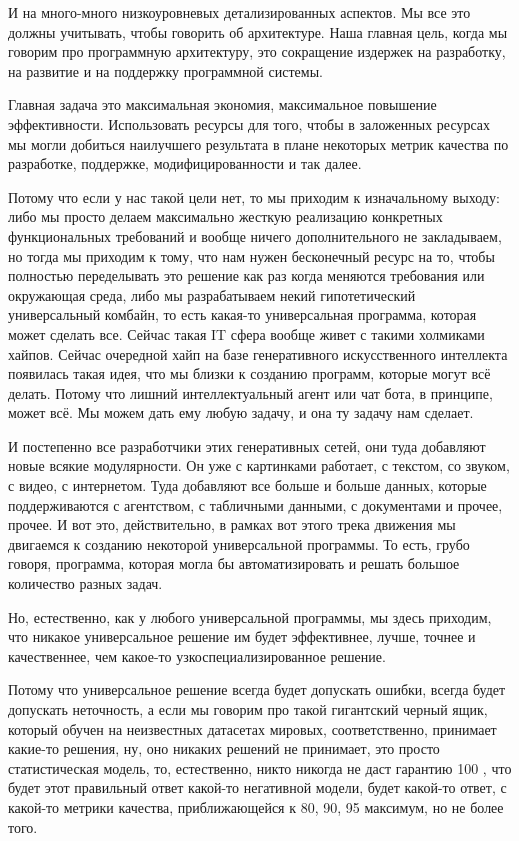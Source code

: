И на много-много низкоуровневых детализированных аспектов. Мы все это должны учитывать, чтобы говорить об архитектуре. Наша главная цель, когда мы говорим про программную архитектуру, это сокращение издержек на разработку, на развитие и на поддержку программной системы.

Главная задача это максимальная экономия, максимальное повышение эффективности. Использовать ресурсы для того, чтобы в заложенных ресурсах мы могли добиться наилучшего результата в плане некоторых метрик качества по разработке, поддержке, модифицированности и так далее.

Потому что если у нас такой цели нет, то мы приходим к изначальному выходу: либо мы просто делаем максимально жесткую реализацию конкретных функциональных требований и вообще ничего дополнительного не закладываем, но тогда мы приходим к тому, что нам нужен бесконечный ресурс на то, чтобы полностью переделывать это решение как раз когда меняются требования или окружающая среда, либо мы разрабатываем некий гипотетический универсальный комбайн, то есть какая-то универсальная программа, которая может сделать все. Сейчас такая IT сфера вообще живет с такими холмиками хайпов. Сейчас очередной хайп на базе генеративного искусственного интеллекта появилась такая идея, что мы близки к созданию программ, которые могут всё делать. Потому что лишний интеллектуальный агент или чат бота, в принципе, может всё. Мы можем дать ему любую задачу, и она ту задачу нам сделает.

И постепенно все разработчики этих генеративных сетей, они туда добавляют новые всякие модулярности. Он уже с картинками работает, с текстом, со звуком, с видео, с интернетом. Туда добавляют все больше и больше данных, которые поддерживаются с агентством, с табличными данными, с документами и прочее, прочее. И вот это, действительно, в рамках вот этого трека движения мы двигаемся к созданию некоторой универсальной программы. То есть, грубо говоря, программа, которая могла бы автоматизировать и решать большое количество разных задач. 

Но, естественно, как у любого универсальной программы, мы здесь приходим, что никакое универсальное решение им будет эффективнее, лучше, точнее и качественнее, чем какое-то узкоспециализированное решение. 

Потому что универсальное решение всегда будет допускать ошибки, всегда будет допускать неточность, а если мы говорим про такой гигантский черный ящик, который обучен на неизвестных датасетах  мировых, соответственно, принимает какие-то решения, ну, оно никаких решений не принимает, это просто статистическая модель, то, естественно, никто никогда не даст гарантию 100 , что будет этот правильный ответ какой-то негативной модели, будет какой-то ответ, с какой-то метрики качества, приближающейся к 80, 90, 95 максимум, но не более того. 

